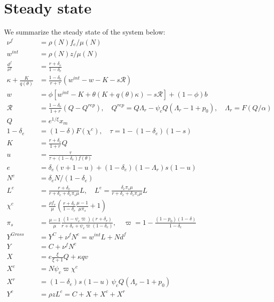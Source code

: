 \documentclass[authoryear, review, 12pt]{elsarticle}
\begin{document}


	\section{Steady state}\label{app:steady_state}
	We summarize the steady state of the system below:
	\begin{align}
		\nu^f&=\rho(N)f_e/\mu(N)\\
		w^{int}&=\rho(N)z/\mu(N)\\
		\frac{d^f}{\nu^f}&=\frac{r+\delta_e}{1-\delta_e}\\
		\kappa+\frac{K}{q(\theta)}&=\frac{1-\delta_e}{r+\tau}(w^{int}-w-K-s\mathcal{R})\\
		w &= \phi \left[ w^{int}-K+\theta(K+q(\theta)\kappa)-s\mathcal{R}\right]+(1-\phi)b\\
		\mathcal{R}&=\frac{1-\delta_e}{1+r}\left(Q-Q^{rep}\right),\quad
		Q^{rep}=Q\Lambda_r-\psi_cQ(\Lambda_r-1+p_0),\quad
		\Lambda_r=F(Q/\alpha)\\
		Q&=e^{1/\xi}x_m \\
		1-\delta_e&=(1-\delta)F(\chi^c),\quad \tau=1-(1-\delta_e)(1-s)\\
		K&=\frac{r+\delta_e}{1+r}Q\\
		u&=\frac{\tau}{\tau+(1-\delta_e)f(\theta)}\label{eq:u_ss}\\
		e&=\delta_e(v+1-u)+(1-\delta_e)(1-\Lambda_r)s(1-u)\label{eq:e_ss}\\
		N^e&=\delta_e N/(1-\delta_e)\\
		L^c&=\frac{r+\delta_e}{r+\delta_e+\delta_e \pi_s \mu}L,\quad L^e=\frac{\delta_e \pi_s \mu}{r+\delta_e+\delta_e\pi_s \mu}L\label{eq:labor_ss}\\
		\chi^c&=\frac{\rho f_e}{\mu}\left(\frac{r+\delta_e}{1-\delta_e}\frac{\mu-1}{\mu \pi_s}+1\right)\\
		\pi_s&=\frac{\mu-1}{\mu}\frac{(1-\psi_c\varpi)(r+\delta_e)}{r+\delta_e+\psi_c\varpi(1-\delta_e)},\quad \varpi=1-\frac{(1-p_0)(1-\delta)}{1-\delta_e}\\
		Y^{Gross}&=Y^C+\nu^f N^e=w^{int}L+Nd^f\\
		Y&=C+\nu^fN^e\\
		X&=e\frac{\xi}{\xi+1}Q+\kappa qv\\
		X^c&=N\psi_c\varpi\chi^c\\
		X^r&=(1-\delta_e)s(1-u)\,\psi_cQ(\Lambda_r-1+p_0)\\
		Y^c&=\rho zL^c=C+X+X^c+X^r\\
	\end{align}
\end{document}
